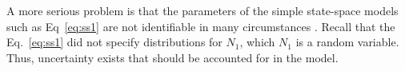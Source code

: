 \documentclass[12pt]{article}
\begin{document}
A more serious problem %
is that the parameters of the simple state-space models
such as Eq~\ref{eq:ss1} are not identifiable in many
circumstances \citep{polansky_etal:2009}. Recall that the
Eq.~\ref{eq:ss1} did not specify distributions for $N_1$, %
which $N_1$ is a random variable. Thus, uncertainty exists
that should be accounted for in the model.  
\end{document}
